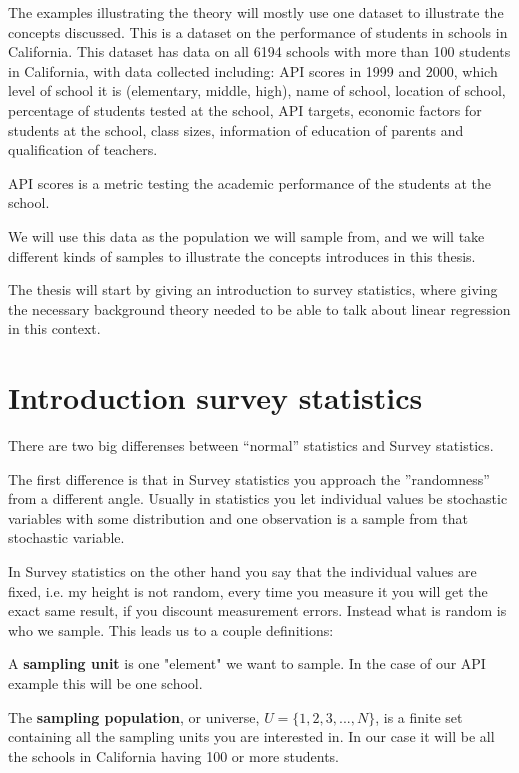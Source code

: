 \documentclass{article}
\begin{document}
The examples illustrating the theory will mostly use one dataset to illustrate the concepts
discussed. This is a dataset on the performance of students in schools in
California. This dataset has data on all 6194 schools with more than 100
students in California, with data collected
including: API scores in 1999 and 2000, which level of school it is
(elementary, middle, high), name of school, location of school, percentage of
students tested at the school, API targets, economic factors for students at the
school, class sizes, information of education of parents and qualification of teachers.

API scores is a metric testing the academic performance of the students at the school.

We will use this data as the population we will sample from, and we will take
different kinds of samples to illustrate the concepts introduces in this thesis.

The thesis will start by giving an introduction to survey statistics, where giving the necessary background theory needed to be able to talk about linear regression in this context.

\section{Introduction survey statistics}

There are two big differenses between ``normal'' statistics and Survey statistics.

The first difference is that in Survey statistics you approach the ''randomness'' from a different angle.
Usually in statistics you let individual values be stochastic variables
with some distribution and one observation is a sample from that stochastic
variable.

In Survey statistics on the other hand you say that the individual values are
fixed, i.e. my height is not random, every time you measure it you will get the
exact same result, if you discount measurement errors. Instead what is random is
who we sample. This leads us to a couple definitions:

\begin{definition} \label{def:sampUnit}
  A \textbf{sampling unit} is one "element" we want to sample. In the case of
  our API example this will be one school.
\end{definition}

\begin{definition} \label{def:sampPop}
The \textbf{sampling population}, or universe, \(U = \{1, 2, 3, ..., N\}\), is a
finite set containing all the sampling units you are interested in. In our case
it will be all the schools in California having 100 or more students.
\end{definition}
\end{document}
